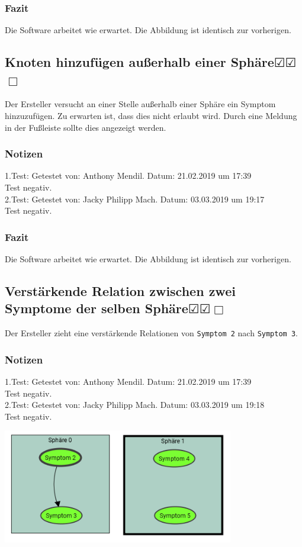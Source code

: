 \documentclass[enabledeprecatedfontcommands]{scrartcl}
\newcommand{\subsectiont}[2]{\subsection[#1]{#1{\normalsize\normalfont #2}}}
\newcommand{\leer}{$\Box$}
\newcommand{\ok}{$\CheckedBox$}
\begin{document}
\subsubsection{Fazit}
Die Software arbeitet wie erwartet. Die Abbildung ist identisch zur vorherigen.

\subsectiont{Knoten hinzufügen außerhalb einer Sphäre}{\dotfill\ok\ok\leer}
Der Ersteller versucht an einer Stelle außerhalb einer Sphäre ein Symptom hinzuzufügen. Zu erwarten ist, dass dies nicht erlaubt wird. Durch eine Meldung in der Fußleiste sollte dies angezeigt werden. 
\subsubsection{Notizen}
1.Test: Getestet von: Anthony Mendil. Datum: 21.02.2019 um 17:39 \\
Test negativ.\\
2.Test: Getestet von: Jacky Philipp Mach. Datum: 03.03.2019 um 19:17 \\
Test negativ.
\subsubsection{Fazit}
Die Software arbeitet wie erwartet. Die Abbildung ist identisch zur vorherigen.

\subsectiont{Verstärkende Relation zwischen zwei Symptome der selben Sphäre}{\dotfill\ok\ok\leer}
Der Ersteller zieht eine verstärkende Relationen von \texttt{Symptom 2} nach \texttt{Symptom 3}. 
\subsubsection{Notizen}
1.Test: Getestet von: Anthony Mendil. Datum: 21.02.2019 um 17:39 \\
Test negativ.\\
2.Test: Getestet von: Jacky Philipp Mach. Datum: 03.03.2019 um 19:18 \\
Test negativ.
\begin{center}
\includegraphics[height=5cm]{1_6.PNG}
\end{center}
\end{document}
